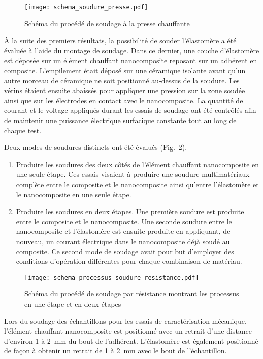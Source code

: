 \begin{figure}[h]
	\centering
	\texttt{[image: schema\_soudure\_presse.pdf]}
	\caption{Schéma du procédé de soudage à la presse chauffante}
	\label{fig:schema_soudure_presse}
\end{figure}

À la suite des premiers résultats, la possibilité de souder l'élastomère a été évaluée à l'aide du montage de soudage. 
Dans ce dernier, une couche d'élastomère est déposée sur un élément chauffant nanocomposite reposant sur un adhérent en composite. 
L'empilement était déposé sur une céramique isolante avant qu'un autre morceau de céramique ne soit positionné au-dessus de la soudure. 
Les vérins étaient ensuite abaissés pour appliquer une pression sur la zone soudée ainsi que sur les électrodes en contact avec le nanocomposite. 
La quantité de courant et le voltage appliqués durant les essais de soudage ont été contrôlés afin de maintenir une puissance électrique surfacique constante tout au long de chaque test. 

Deux modes de soudures distincts ont été évalués (Fig.~\ref{fig:schema_processus_soudure_resistance}). 
\begin{enumerate}
	\item Produire les soudures des deux côtés de l'élément chauffant nanocomposite en une seule étape. 
	Ces essais visaient à produire une soudure multimatériaux complète entre le composite et le nanocomposite ainsi qu'entre l'élastomère et le nanocomposite en une seule étape. 
	\item Produire les soudures en deux étapes. 
	Une première soudure est produite entre le composite et le nanocomposite. 
	Une seconde soudure entre le nanocomposite et l'élastomère est ensuite produite en appliquant, de nouveau, un courant électrique dans le nanocomposite déjà soudé au composite. 
	Ce second mode de soudage avait pour but d'employer des conditions d'opération différentes pour chaque combinaison de matériau. 
\end{enumerate}
\FloatBarrier

\begin{figure}[t!]
	\centering
	\texttt{[image: schema\_processus\_soudure\_resistance.pdf]}
	\caption{Schéma du procédé de soudage par résistance montrant les processus en une étape et en deux étapes}
	\label{fig:schema_processus_soudure_resistance}
\end{figure}
\FloatBarrier

Lors du soudage des échantillons pour les essais de caractérisation mécanique, l'élément chauffant nanocomposite est positionné avec un retrait d'une distance d'environ 1 à \SI[locale=FR]{2}{\milli\metre} du bout de l'adhérent. 
L'élastomère est également positionné de façon à obtenir un retrait de 1 à \SI[locale=FR]{2}{\milli\metre} avec le bout de l'échantillon. 

